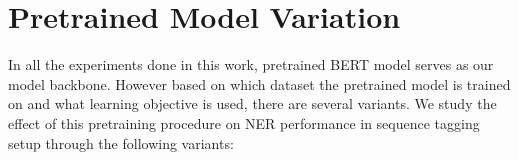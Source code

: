 


\section{Pretrained Model Variation}
In all the experiments done in this work, pretrained BERT model serves as our model backbone. However based on which dataset the pretrained model is trained on and what learning objective is used, there are several variants. We study the effect of this pretraining procedure on NER performance in sequence tagging setup through the following variants: 

